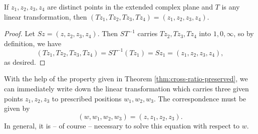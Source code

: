 \begin{theorem}
	\label{thm:cross-ratio-preserved}
	If $z_1,z_2,z_3,z_4$ are distinct points in the extended complex plane and $T$ is any linear transformation, then $(Tz_1,Tz_2,Tz_3,Tz_4)=(z_1,z_2,z_3,z_4)$.
\end{theorem}

\begin{proof}
	Let $Sz=(z,z_2,z_3,z_4)$. Then $ST^{-1}$ carries $Tz_2,Tz_3,Tz_4$ into $1,0,\infty$, so by definition, we have $$(Tz_1,Tz_2,Tz_3,Tz_4)=ST^{-1}(Tz_1)=Sz_1=(z_1,z_2,z_3,z_4),$$ as desired.
\end{proof}

With the help of the property given in Theorem \ref{thm:cross-ratio-preserved}, we can immediately write down the linear transformation which carries three given points $z_1,z_2,z_3$ to prescribed positions $w_1,w_2,w_3$. The correspondence must be given by $$(w,w_1,w_2,w_3)=(z,z_1,z_2,z_3).$$ In general, it is -- of course -- necessary to solve this equation with respect to $w$.

